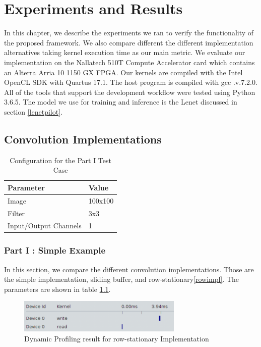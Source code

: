 
\chapter{Experiments and Results} %

\label{Chapter4} %

In this chapter, we describe the experiments we ran to verify the functionality of the proposed framework. We also compare different the different implementation alternatives taking kernel execution time as our main metric. We evaluate our implementation on the Nallatech 510T Compute Accelerator card which contains an Alterra Arria 10 1150 GX FPGA. Our kernels are compiled with the Intel OpenCL SDK with Quartus 17.1. The host program is compiled with gcc .v.7.2.0. All of the tools that support the development workflow were tested using Python 3.6.5. 
The model we use for training and inference is the Lenet discussed in section \ref{lenetpilot}.


\section{Convolution Implementations}

\begin{table}[]
\centering
\begin{tabular}{|l|l|}
\hline
\textbf{Parameter}    & \textbf{Value} \\ \hline
Image                 & 100x100        \\ \hline
Filter                & 3x3            \\ \hline
Input/Output Channels & 1              \\ \hline
\end{tabular}
\caption{Configuration for the Part I Test Case}
\label{tab:partoneconfig}
\end{table}

\subsection{Part I : Simple Example} \label{testone}
In this section, we compare the different convolution implementations. Those are the simple implementation, sliding buffer, and row-stationary\ref{rowimpl}. The parameters are shown in table \ref{tab:partoneconfig}. 

\begin{figure}[h]
\centering
\includegraphics[width=0.7\textwidth]{Figures/profilerow}
\decoRule
\caption[profilerow]{ Dynamic Profiling result for row-stationary Implementation}
\label{fig:rowstatp}
\end{figure}

